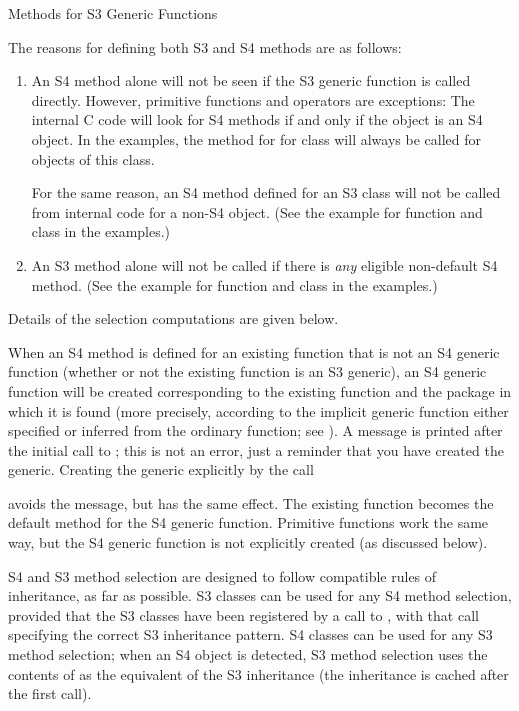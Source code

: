 \begin{Section}{Methods for S3 Generic Functions}

The reasons for defining both S3 and S4 methods are as follows:
\begin{enumerate}

\item An S4 method alone will not be seen if the S3 generic function
is called directly.  However, primitive functions and operators
are exceptions:  The internal C code will look for S4 methods
if and only if the object is an S4 object.  In the examples, the method
for \code{`[`} for class  will always be called
for objects of this class.

For the same reason, an S4 method defined for an S3 class will not be called from
internal code for a non-S4 object. (See the example for function
 and
class  in the examples.)
\item An S3 method alone will not be called if there is \emph{any}
eligible non-default S4 method. (See the example for function
 and class  in the examples.)

\end{enumerate}

Details of the selection computations are given below.

When an S4 method is defined for an existing function that is not an
S4 generic function (whether or not the existing function is an S3 generic),
an S4 generic function will be created corresponding to the existing
function and the package in which it is found (more precisely,
according to the implicit generic function either specified or
inferred from the ordinary function; see ).
A message is printed after the initial call to
; this is not an error, just a reminder that
you have created the generic.
Creating the generic explicitly by the call


avoids the message, but has the same effect.
The existing function becomes the default method for
the S4 generic function.
Primitive functions work the same way, but
the S4 generic function is not explicitly created (as discussed below).


S4 and S3 method selection are designed to follow compatible rules of
inheritance, as far as possible.
S3 classes can be used for any S4 method selection, provided that the
S3 classes have been registered by a call to
, with that call specifying the correct S3
inheritance pattern.
S4 classes can be used for any S3 method selection; when an S4 object
is detected, S3 method selection uses the contents of
 as the equivalent of the S3
inheritance (the inheritance is cached after the first call).


\end{Section}
